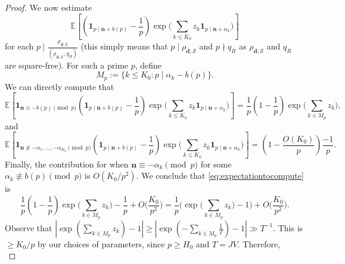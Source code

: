 \documentclass[11pt]{amsart}
\theoremstyle{definition}
\renewcommand{\leq}{\leqslant}
\renewcommand{\geq}{\geqslant}
\newcommand{\ind}[1]{\mathbf{1}_{#1}}
\renewcommand{\d}{\boldsymbol{d}}
\newcommand{\n}{\mathbf{n}}
\newcommand{\curlyL}{V}
\newcommand{\sommespart}{b}
\newcommand{\fprod}[1]{\rho_{#1}}
\newcommand{\s}{\mathcal{S}}
\newcommand{\modulus}{q}
\newcommand{\repR}{J}
\newcommand{\insingleproof}{M}
\newcommand{\otherL}{T}
\newcommand{\littleh}{k}
\begin{document}
\begin{proof}
We now estimate
\begin{equation}
\label{eq:expectationtocompute}
	\mathbb{E} \left[\left(\ind{p \mid \n+\sommespart(p)} - \frac{1}{p}\right) \exp \bigg(\sum_{\littleh \leq K_0} z_{\littleh} \ind{p\mid \n + \alpha_{\littleh}}\bigg) \right]
\end{equation}
for each $p \mid \frac{\fprod{\d; \s}}{(\fprod{\d; \s}, \modulus_R)}$ (this simply means that $p\mid \fprod{\d; \s}$ and $p\nmid \modulus_R$ as $\fprod{\d; \s}$ and $\modulus_R$ are square-free). For such a prime $p$, define 
\begin{equation}
\label{eq:insingleproof}
\insingleproof_{p} := \{\littleh \leq K_0 : p\mid \alpha_{\littleh} - \sommespart(p)\}.
\end{equation}
We can directly compute that 
\begin{equation*}
	\mathbb{E} \left[\ind{\n \equiv -\sommespart(p) \!\!\!\!\pmod{p}} \left(\ind{p \mid \n+\sommespart(p)} - \frac{1}{p}\right) \exp \bigg(\sum_{\littleh \leq K_0} z_{\littleh} \ind{p\mid \n + \alpha_{\littleh}}\bigg) \right] = \frac{1}{p} \left(1- \frac{1}{p}\right) \exp \bigg(\sum_{\littleh \in \insingleproof_p} z_{\littleh}\bigg),
\end{equation*}
and
\begin{equation*}
	\mathbb{E} \left[\ind{\n \not\equiv -\alpha_1,\ldots, -\alpha_{K_0} \!\!\!\!\pmod{p}} \left(\ind{p \mid \n+\sommespart(p)} - \frac{1}{p}\right) \exp \bigg(\sum_{\littleh \leq K_0} z_{\littleh} \ind{p\mid \n + \alpha_{\littleh}}\bigg) \right] =  \left(1- \frac{O(K_0)}{p}\right) \frac{-1}{p}.
\end{equation*}
Finally, the contribution for when $\n \equiv -\alpha_k \pmod{p}$ for some $\alpha_k \not\equiv \sommespart(p) \pmod{p}$ is $O(K_0/p^2)$. We conclude that \cref{eq:expectationtocompute} is
\begin{equation*}
	\frac{1}{p} \left(1- \frac{1}{p}\right) \exp \bigg(\sum_{\littleh \in \insingleproof_p} z_{\littleh}\bigg) - \frac{1}{p} + O \bigg(\frac{K_0}{p^2}\bigg) = \frac{1}{p} \bigg( \exp \bigg(\sum_{\littleh \in \insingleproof_p}z_{\littleh}\bigg) - 1\bigg) + O \bigg(\frac{K_0}{p^2}\bigg).
\end{equation*}
Observe that $\left|\exp \left(\sum_{\littleh \in \insingleproof_p} z_{\littleh} \right)-1\right| \geq \left| \exp \left( -\sum_{\littleh \in \insingleproof_p} \tfrac{1}{\otherL} \right) - 1 \right| \gg \otherL^{-1}$. This is $\geq K_0/p$ by our choices of parameters, since $p\geq H_0$ and $T = \repR \curlyL$. Therefore,
\begin{equation}

\end{equation}
\end{proof}
\end{document}
